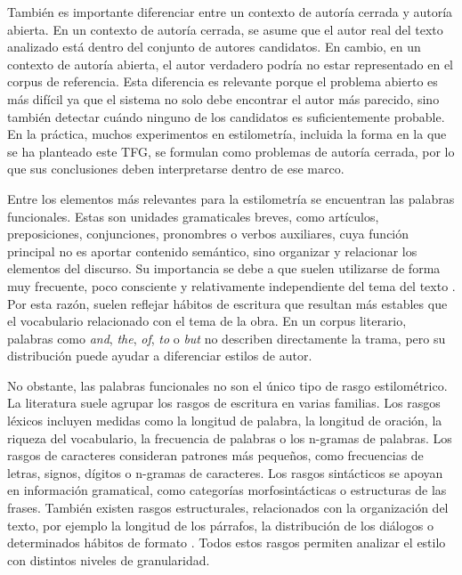 \documentclass[IB]{TFUOC}%
\begin{document}
También es importante diferenciar entre un contexto de autoría cerrada y autoría abierta. En un contexto de autoría cerrada, se asume que el autor real del texto analizado está dentro del conjunto de autores candidatos. En cambio, en un contexto de autoría abierta, el autor verdadero podría no estar representado en el corpus de referencia. Esta diferencia es relevante porque el problema abierto es más difícil ya que el sistema no solo debe encontrar el autor más parecido, sino también detectar cuándo ninguno de los candidatos es suficientemente probable. En la práctica, muchos experimentos en estilometría, incluida la forma en la que se ha planteado este TFG, se formulan como problemas de autoría cerrada, por lo que sus conclusiones deben interpretarse dentro de ese marco.

Entre los elementos más relevantes para la estilometría se encuentran las palabras funcionales. Estas son unidades gramaticales breves, como artículos, preposiciones, conjunciones, pronombres o verbos auxiliares, cuya función principal no es aportar contenido semántico, sino organizar y relacionar los elementos del discurso. Su importancia se debe a que suelen utilizarse de forma muy frecuente, poco consciente y relativamente independiente del tema del texto \cite{stamatatos2009survey}. Por esta razón, suelen reflejar hábitos de escritura que resultan más estables que el vocabulario relacionado con el tema de la obra. En un corpus literario, palabras como \textit{and}, \textit{the}, \textit{of}, \textit{to} o \textit{but} no describen directamente la trama, pero su distribución puede ayudar a diferenciar estilos de autor.

No obstante, las palabras funcionales no son el único tipo de rasgo estilométrico. La literatura suele agrupar los rasgos de escritura en varias familias. Los rasgos léxicos incluyen medidas como la longitud de palabra, la longitud de oración, la riqueza del vocabulario, la frecuencia de palabras o los n-gramas de palabras. Los rasgos de caracteres consideran patrones más pequeños, como frecuencias de letras, signos, dígitos o n-gramas de caracteres. Los rasgos sintácticos se apoyan en información gramatical, como categorías morfosintácticas o estructuras de las frases. También existen rasgos estructurales, relacionados con la organización del texto, por ejemplo la longitud de los párrafos, la distribución de los diálogos o determinados hábitos de formato \cite{zheng2006framework,stamatatos2009survey}. Todos estos rasgos permiten analizar el estilo con distintos niveles de granularidad.
\end{document}
